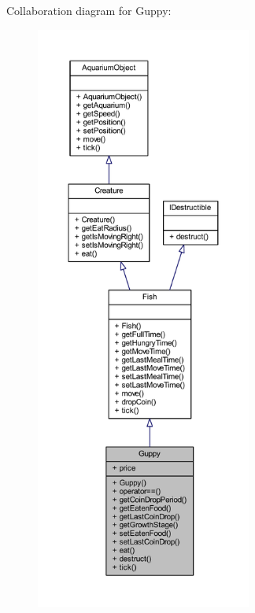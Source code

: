 Collaboration diagram for Guppy\+:
\nopagebreak
\begin{figure}[H]
\begin{center}
\leavevmode
\includegraphics[height=550pt]{class_guppy__coll__graph}
\end{center}
\end{figure}
